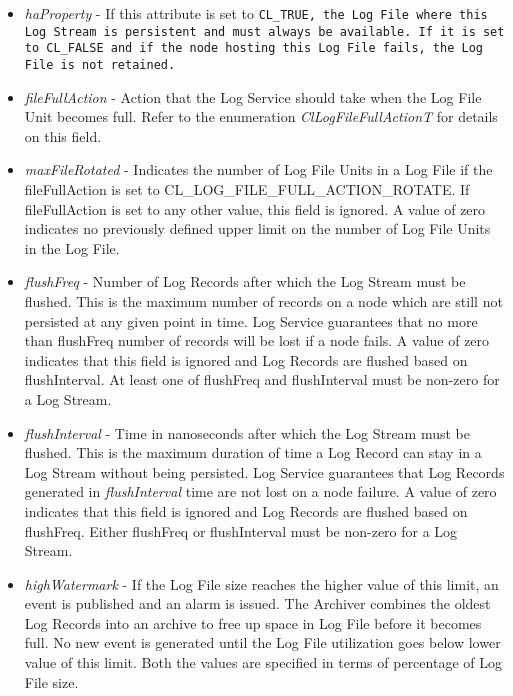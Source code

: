 \begin{flushleft}
\begin{itemize}
\item
\textit{haProperty} - If this attribute is set to \tt{CL\_\-TRUE}, the Log File where this Log Stream is persistent and must always be available. 
If it is set to \tt{CL\_\-FALSE} and if the node hosting this Log File fails, the Log File is not retained.
\item
\textit{fileFullAction} - Action that the Log Service should take when the Log File Unit becomes full. Refer to the enumeration 
\textit{ClLogFileFullActionT} for details on this field.
\item
\textit{maxFileRotated} - Indicates the number of Log File Units in a Log File if the fileFullAction is set to 
CL\_\-LOG\_\-FILE\_\-FULL\_\-ACTION\_\-ROTATE. If fileFullAction is set to any other value, this field is ignored. 
A value of zero indicates no previously defined upper limit on the number of Log File Units in the Log File.
\item
\textit{flushFreq} - Number of Log Records after which the Log Stream must be flushed. This is the maximum number of records on a node which are still
not persisted at any given point in time. Log Service guarantees that no more than flushFreq number of records will be lost if a node fails. A value of 
zero indicates that this field is ignored and Log Records are flushed based on flushInterval. At least one of flushFreq and flushInterval must be 
non-zero for a Log Stream.
\item
\textit{flushInterval} - Time in nanoseconds after which the Log Stream must be flushed. This is the maximum duration of time a Log Record can stay 
in a Log Stream without being persisted. Log Service guarantees that Log Records generated in \textit{flushInterval} time are not lost on a node failure. 
A value of zero indicates that this field is ignored and Log Records are flushed based on flushFreq. 
Either flushFreq or flushInterval must be non-zero for a Log Stream.
\item
\textit{highWatermark} - If the Log File size reaches the higher value of this limit, an event is published and an alarm is issued. The Archiver 
combines the oldest Log Records into an archive to free up space in Log File before it becomes full. No new event is generated until the 
Log File utilization goes below lower value of this limit. Both the values are specified in terms of percentage of Log File size.

\end{itemize}



\end{flushleft}
